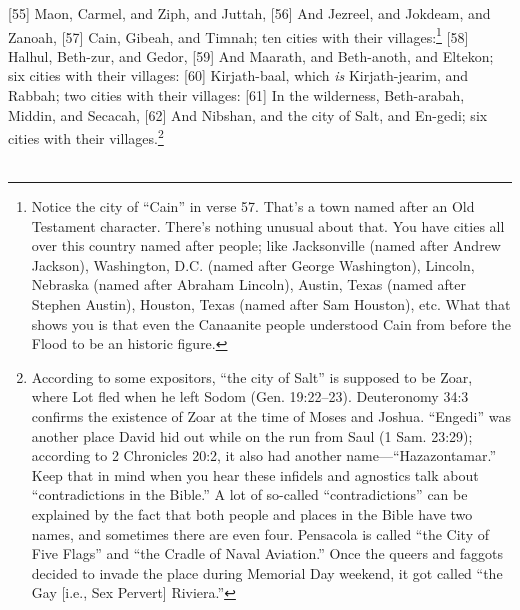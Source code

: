 [55] \textcolor[rgb]{0.00,0.00,1.00}{Maon, Carmel, and Ziph, and Juttah,}
[56] \textcolor[rgb]{0.00,0.00,1.00}{And Jezreel, and Jokdeam, and Zanoah,}
[57] \textcolor[rgb]{0.00,0.00,1.00}{Cain, Gibeah, and Timnah; ten cities with their villages:}\footnote{Notice the city of “Cain” in verse 57.
That’s a town named after an Old Testament
character. There’s nothing unusual about that.
You have cities all over this country named
after people; like Jacksonville (named after
Andrew Jackson), Washington, D.C. (named
after George Washington), Lincoln, Nebraska
(named after Abraham Lincoln), Austin, Texas
(named after Stephen Austin), Houston, Texas
(named after Sam Houston), etc. What that
shows you is that even the Canaanite people
understood Cain from before the Flood to be an
historic figure.}
[58] \textcolor[rgb]{0.00,0.00,1.00}{Halhul, Beth-zur, and Gedor,}
[59] \textcolor[rgb]{0.00,0.00,1.00}{And Maarath, and Beth-anoth, and Eltekon; six cities with their villages:}
[60] \textcolor[rgb]{0.00,0.00,1.00}{Kirjath-baal, which \emph{is} Kirjath-jearim, and Rabbah; two cities with their villages:}
[61] \textcolor[rgb]{0.00,0.00,1.00}{In the wilderness, Beth-arabah, Middin, and Secacah,}
[62] \textcolor[rgb]{0.00,0.00,1.00}{And Nibshan, and the city of Salt, and En-gedi; six cities with their villages.}\footnote{According to some expositors, “the city of
Salt” is supposed to be Zoar, where Lot fled
when he left Sodom (Gen. 19:22–23).
Deuteronomy 34:3 confirms the existence of
Zoar at the time of Moses and Joshua.
“Engedi” was another place David hid out
while on the run from Saul (1 Sam. 23:29);
according to 2 Chronicles 20:2, it also had
another name—“Hazazontamar.”
Keep that in mind when you hear these
infidels and agnostics talk about “contradictions
in the Bible.” A lot of so-called “contradictions”
can be explained by the fact that both people
and places in the Bible have two names, and
sometimes there are even four. Pensacola is
called “the City of Five Flags” and “the Cradle
of Naval Aviation.” Once the queers and
faggots decided to invade the place during
Memorial Day weekend, it got called “the Gay
[i.e., Sex Pervert] Riviera.”}\\
\\
